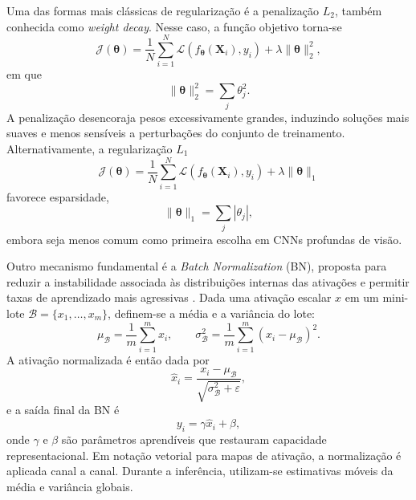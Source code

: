 \documentclass[tcc,capa]{texufpel}
\begin{document}
Uma das formas mais clássicas de regularização é a penalização $L_2$, também conhecida como \textit{weight decay}. Nesse caso, a função objetivo torna-se
\begin{equation}
\mathcal{J}(\boldsymbol{\theta})
=
\frac{1}{N}\sum_{i=1}^{N}\mathcal{L}(f_{\boldsymbol{\theta}}(\mathbf{X}_i),y_i)
+
\lambda \|\boldsymbol{\theta}\|_2^2,
\end{equation}
em que
\begin{equation}
\|\boldsymbol{\theta}\|_2^2 = \sum_{j}\theta_j^2.
\end{equation}
A penalização desencoraja pesos excessivamente grandes, induzindo soluções mais suaves e menos sensíveis a perturbações do conjunto de treinamento. Alternativamente, a regularização $L_1$
\begin{equation}
\mathcal{J}(\boldsymbol{\theta})
=
\frac{1}{N}\sum_{i=1}^{N}\mathcal{L}(f_{\boldsymbol{\theta}}(\mathbf{X}_i),y_i)
+
\lambda \|\boldsymbol{\theta}\|_1
\end{equation}
favorece esparsidade,
\begin{equation}
\|\boldsymbol{\theta}\|_1 = \sum_j |\theta_j|,
\end{equation}
embora seja menos comum como primeira escolha em CNNs profundas de visão.

Outro mecanismo fundamental é a \textit{Batch Normalization} (BN), proposta para reduzir a instabilidade associada às distribuições internas das ativações e permitir taxas de aprendizado mais agressivas \cite{Ioffe2015}. Dada uma ativação escalar $x$ em um mini-lote $\mathcal{B}=\{x_1,\dots,x_m\}$, definem-se a média e a variância do lote:
\begin{equation}
\mu_{\mathcal{B}} = \frac{1}{m}\sum_{i=1}^{m}x_i,
\qquad
\sigma^2_{\mathcal{B}} = \frac{1}{m}\sum_{i=1}^{m}(x_i-\mu_{\mathcal{B}})^2.
\end{equation}
A ativação normalizada é então dada por
\begin{equation}
\hat{x}_i = \frac{x_i - \mu_{\mathcal{B}}}{\sqrt{\sigma^2_{\mathcal{B}}+\varepsilon}},
\end{equation}
e a saída final da BN é
\begin{equation}
y_i = \gamma \hat{x}_i + \beta,
\end{equation}
onde $\gamma$ e $\beta$ são parâmetros aprendíveis que restauram capacidade representacional. Em notação vetorial para mapas de ativação, a normalização é aplicada canal a canal. Durante a inferência, utilizam-se estimativas móveis da média e variância globais.
\end{document}
